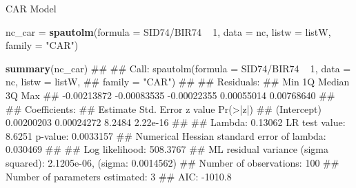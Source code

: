 \documentclass[11pt,ignorenonframetext,]{beamer}
\newenvironment{Shaded}{}{}
\newcommand{\DataTypeTok}[1]{\textcolor[rgb]{0.56,0.13,0.00}{#1}}
\newcommand{\DecValTok}[1]{\textcolor[rgb]{0.25,0.63,0.44}{#1}}
\newcommand{\KeywordTok}[1]{\textcolor[rgb]{0.00,0.44,0.13}{\textbf{#1}}}
\newcommand{\NormalTok}[1]{#1}
\newcommand{\OperatorTok}[1]{\textcolor[rgb]{0.40,0.40,0.40}{#1}}
\newcommand{\StringTok}[1]{\textcolor[rgb]{0.25,0.44,0.63}{#1}}
\let\oldShaded\Shaded
\let\endoldShaded\endShaded
\renewenvironment{Shaded}{\footnotesize\begin{spacing}{0.9}\oldShaded}{\endoldShaded\end{spacing}}
\let\oldverbatim\verbatim
\let\endoldverbatim\endverbatim
\newcommand{\scriptoutput}{
  \renewenvironment{Shaded}{\scriptsize\begin{spacing}{0.9}\oldShaded}{\endoldShaded\end{spacing}}
  \renewenvironment{verbatim}{\scriptsize\begin{spacing}{0.9}\oldverbatim}{\endoldverbatim\end{spacing}}
}
\begin{document}
\begin{frame}[fragile,t]{CAR Model}
\protect\hypertarget{car-model}{}

\scriptoutput

\begin{Shaded}
\begin{Highlighting}[]
\NormalTok{nc_car =}\StringTok{ }\KeywordTok{spautolm}\NormalTok{(}\DataTypeTok{formula =}\NormalTok{ SID74}\OperatorTok{/}\NormalTok{BIR74 }\OperatorTok{~}\StringTok{ }\DecValTok{1}\NormalTok{, }\DataTypeTok{data =}\NormalTok{ nc, }
                  \DataTypeTok{listw =}\NormalTok{ listW, }\DataTypeTok{family =} \StringTok{"CAR"}\NormalTok{) }

\KeywordTok{summary}\NormalTok{(nc_car)}
\NormalTok{## }
\NormalTok{## Call: spautolm(formula = SID74/BIR74 ~ 1, data = nc, listw = listW, }
\NormalTok{##     family = "CAR")}
\NormalTok{## }
\NormalTok{## Residuals:}
\NormalTok{##         Min          1Q      Median          3Q         Max }
\NormalTok{## -0.00213872 -0.00083535 -0.00022355  0.00055014  0.00768640 }
\NormalTok{## }
\NormalTok{## Coefficients: }
\NormalTok{##               Estimate Std. Error z value Pr(>|z|)}
\NormalTok{## (Intercept) 0.00200203 0.00024272  8.2484 2.22e-16}
\NormalTok{## }
\NormalTok{## Lambda: 0.13062 LR test value: 8.6251 p-value: 0.0033157 }
\NormalTok{## Numerical Hessian standard error of lambda: 0.030469 }
\NormalTok{## }
\NormalTok{## Log likelihood: 508.3767 }
\NormalTok{## ML residual variance (sigma squared): 2.1205e-06, (sigma: 0.0014562)}
\NormalTok{## Number of observations: 100 }
\NormalTok{## Number of parameters estimated: 3 }
\NormalTok{## AIC: -1010.8}
\end{Highlighting}
\end{Shaded}

\end{frame}
\end{document}
